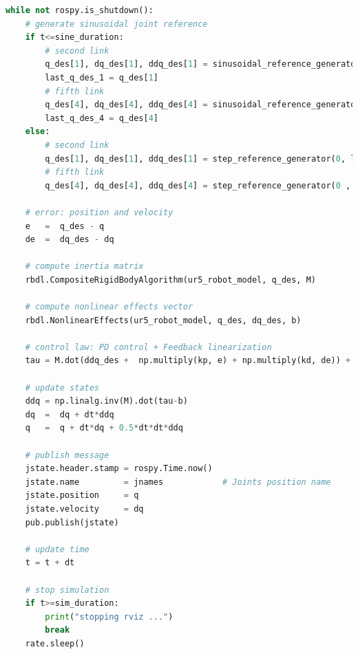 \begin{lstlisting}[language=Python,caption={Move the second and fifth joint of UR5 robot with the required movement of activity 2.6.}, label={lst:inverse_dynamics_desired_states}]
while not rospy.is_shutdown():
    # generate sinusoidal joint reference
    if t<=sine_duration:
        # second link
        q_des[1], dq_des[1], ddq_des[1] = sinusoidal_reference_generator(q0[1], 0.2, 1, t)
        last_q_des_1 = q_des[1]
        # fifth link
        q_des[4], dq_des[4], ddq_des[4] = sinusoidal_reference_generator(q0[4], 0.4, 1.5, t)  
        last_q_des_4 = q_des[4]  
    else:
        # second link
        q_des[1], dq_des[1], ddq_des[1] = step_reference_generator(0, last_q_des_1)
        # fifth link
        q_des[4], dq_des[4], ddq_des[4] = step_reference_generator(0 , last_q_des_4)

    # error: position and velocity
    e 	=  q_des - q
    de 	=  dq_des - dq    

    # compute inertia matrix
    rbdl.CompositeRigidBodyAlgorithm(ur5_robot_model, q_des, M)

    # compute nonlinear effects vector
    rbdl.NonlinearEffects(ur5_robot_model, q_des, dq_des, b) 

    # control law: PD control + Feedback linearization
    tau = M.dot(ddq_des +  np.multiply(kp, e) + np.multiply(kd, de)) + b
    
    # update states
    ddq = np.linalg.inv(M).dot(tau-b)
    dq  =  dq + dt*ddq
    q   =  q + dt*dq + 0.5*dt*dt*ddq

    # publish message
    jstate.header.stamp = rospy.Time.now()
    jstate.name 		= jnames			# Joints position name
    jstate.position 	= q
    jstate.velocity 	= dq
    pub.publish(jstate)

    # update time
    t = t + dt

    # stop simulation
    if t>=sim_duration:
        print("stopping rviz ...")
        break
    rate.sleep()
\end{lstlisting}

